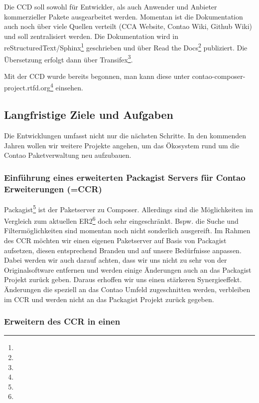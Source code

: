 \documentclass[
paper=a4,
draft=false,%
fontsize=10pt%
]{scrartcl}
\begin{document}
Die CCD soll sowohl für Entwickler, als auch Anwender und Anbieter kommerzieller Pakete ausgearbeitet werden. Momentan ist die Dokumentation auch noch über viele Quellen verteilt (CCA Website, Contao Wiki, Github Wiki) und soll zentralisiert werden. Die Dokumentation wird in reStructuredText/Sphinx\footnote{} geschrieben und über Read the Docs\footnote{} publiziert. Die Übersetzung erfolgt dann über Transifex\footnote{}.

Mit der CCD wurde bereits begonnen, man kann diese unter contao-composer-project.rtfd.org\footnote{} einsehen.

\pagebreak

\subsection{Langfristige Ziele und Aufgaben}
\label{sec:long-term-goals}

Die Entwicklungen umfasst nicht nur die nächsten Schritte. In den kommenden Jahren wollen wir weitere Projekte angehen, um das Ökosystem rund um die Contao Paketverwaltung neu aufzubauen.

\subsubsection{Einführung eines erweiterten Packagist Servers für Contao Erweiterungen (=CCR)}

Packagist\footnote{} ist der Paketserver zu Composer. Allerdings sind die Möglichkeiten im Vergleich zum aktuellen ER2\footnote{} doch sehr eingeschränkt. Bspw. die Suche und Filtermöglichkeiten sind momentan noch nicht sonderlich ausgereift. Im Rahmen des CCR möchten wir einen eigenen Paketserver auf Basis von Packagist aufsetzen, diesen entsprechend Branden und auf unsere Bedürfnisse anpassen.\\
Dabei werden wir auch darauf achten, dass wir uns nicht zu sehr von der Originalsoftware entfernen und werden einige Änderungen auch an das Packagist Projekt zurück geben. Daraus erhoffen wir uns einen stärkeren Synergieeffekt. Änderungen die speziell an das Contao Umfeld zugeschnitten werden, verbleiben im CCR und werden nicht an das Packagist Projekt zurück gegeben.

\subsubsection{Erweitern des CCR in einen }
\end{document}
